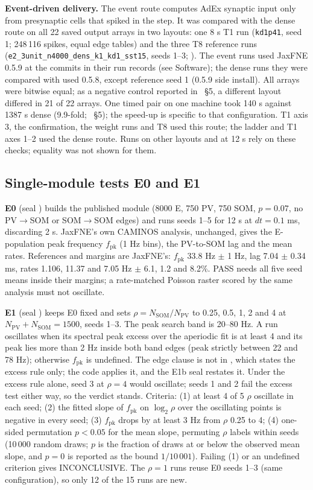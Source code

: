 \textbf{Event-driven delivery.} The event route computes AdEx synaptic input only from presynaptic cells that
spiked in the step. It was compared with the dense route on all 22 saved output arrays in two layouts: one 8 s T1
run (\texttt{kd1p41}, seed 1; 248\,116 spikes, equal edge tables) and the three T8 reference runs
(\texttt{e2\_3unit\_n4000\_dens\_k1\_kd1\_sst15}, seeds 1--3; ). The event runs used JaxFNE 0.5.9 at
the commits in their run records (see Software); the dense runs they were compared with used 0.5.8, except reference seed 1 (0.5.9 side install). All
arrays were bitwise equal; as a negative control reported in ~\S5, a different layout differed in 21 of 22
arrays. One timed pair on one machine took 140 s against 1387 s dense (9.9-fold;
~\S5); the speed-up is specific to that configuration. T1 axis 3, the confirmation, the weight runs and
T8 used this route; the ladder and T1 axes 1--2 used the dense route. Runs on other layouts and at 12 s rely
on these checks; equality was not shown for them.

\subsection{Single-module tests E0 and E1}

\textbf{E0} (seal ) builds the published module (8000 E, 750 PV, 750 SOM, $p = 0.07$,
no PV$\to$SOM or SOM$\to$SOM edges) and runs seeds 1--5 for 12 s at $dt = 0.1$ ms, discarding 2 s. JaxFNE's own
CAMINOS analysis, unchanged, gives the E-population peak frequency $f_\text{pk}$ (1 Hz bins), the
PV-to-SOM lag and the mean rates. References and margins are JaxFNE's: $f_\text{pk}$ 33.8 Hz $\pm$ 1 Hz, lag 7.04
$\pm$ 0.34 ms, rates 1.106, 11.37 and 7.05 Hz $\pm$ 6.1, 1.2 and 8.2\%. PASS needs all five seed means inside their
margins; a rate-matched Poisson raster scored by the same analysis must not oscillate.

\textbf{E1} (seal ) keeps E0 fixed and sets $\rho = N_\text{SOM}/N_\text{PV}$ to 0.25,
0.5, 1, 2 and 4 at $N_\text{PV} + N_\text{SOM} = 1500$, seeds 1--3. The peak search band is 20--80 Hz. A run oscillates when its spectral peak excess over the aperiodic fit is at least 4 and its peak lies more than 2 Hz inside both band edges (peak strictly between 22 and 78 Hz); otherwise $f_\text{pk}$ is undefined. The edge clause is not in , which states the excess rule only; the code applies it, and the E1b seal restates it. Under the excess rule alone, seed 3 at $\rho = 4$ would oscillate; seeds 1 and 2 fail the excess test either way, so the verdict stands. Criteria: (1) at least 4 of 5 $\rho$ oscillate in each seed;
(2) the fitted slope of $f_\text{pk}$ on $\log_2\rho$ over the oscillating points is negative in every
seed; (3) $f_\text{pk}$ drops by at least 3 Hz from $\rho$ 0.25 to 4; (4) one-sided permutation $p < 0.05$ for
the mean slope, permuting $\rho$ labels within seeds (10\,000 random draws; $p$ is the fraction of draws at or
below the observed mean slope, and $p = 0$ is reported as the bound $1/10\,001$). Failing (1) or an undefined criterion gives
INCONCLUSIVE. The $\rho = 1$ runs reuse E0 seeds 1--3 (same configuration), so only 12 of the 15 runs are new.

